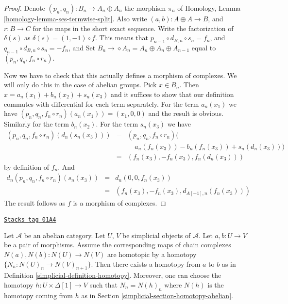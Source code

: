 \begin{proof}
Denote $(p_n, q_n) : B_n \to A_n \oplus A_n$ the morphism $\pi_n$
of Homology, Lemma \ref{homology-lemma-ses-termwise-split}.
Also write $(a, b) : A \oplus A \to B$, and
$r : B \to C$ for the maps in the short exact sequence.
Write the factorization of $\delta(s)$ as
$\delta(s) = (1, -1) \circ f$. This means that
$p_{n - 1} \circ d_{B, n} \circ s_n = f_n$, and
$q_{n - 1} \circ d_{B, n} \circ s_n = - f_n$, and
Set $B_n \to \diamond A_n = A_n \oplus A_n \oplus A_{n - 1}$
equal to $(p_n, q_n, f_n \circ r_n)$.

\medskip\noindent
Now we have to check that this actually defines a morphism
of complexes. We will only do this in the case of abelian groups.
Pick $x \in B_n$. Then $x = a_n(x_1) + b_n(x_2) + s_n(x_3)$
and it suffices to show that our definition commutes
with differential for each term separately. For the term
$a_n(x_1)$ we have $(p_n, q_n, f_n \circ r_n)(a_n(x_1)) =
(x_1, 0, 0)$ and the result is obvious. Similarly for
the term $b_n(x_2)$. For the term $s_n(x_3)$ we have
\begin{eqnarray*}
(p_n, q_n, f_n \circ r_n)(d_n(s_n(x_3))) & = &
(p_n, q_n, f_n \circ r_n)( \\
& & \ \ \ \ \ a_n(f_n(x_3)) - b_n(f_n(x_3)) + s_n(d_n(x_3))) \\
& = &
(f_n(x_3), -f_n(x_3), f_n(d_n(x_3)))
\end{eqnarray*}
by definition of $f_n$. And
\begin{eqnarray*}
d_n(p_n, q_n, f_n \circ r_n)(s_n(x_3)) & = & d_n(0, 0, f_n(x_3)) \\
& = &
(f_n(x_3), - f_n(x_3), d_{A[-1], n}(f_n(x_3)))
\end{eqnarray*}
The result follows as $f$ is a morphism of complexes.
\end{proof}

\begin{lemma}
\label{simplicial-lemma-backwards-homotopy}
\href{https://stacks.math.columbia.edu/tag/01A4}{\texttt{Stacks tag 01A4}}

Let $\mathcal{A}$ be an abelian category.
Let $U$, $V$ be simplicial objects of $\mathcal{A}$.
Let $a, b : U \to V$ be a pair of morphisms.
Assume the corresponding maps of chain complexes
$N(a), N(b) : N(U) \to N(V)$ are homotopic by
a homotopy $\{N_n : N(U)_n \to N(V)_{n + 1}\}$.
Then there exists a homotopy from $a$ to $b$ as in
Definition \ref{simplicial-definition-homotopy}. Moreover, one can choose the
homotopy $h : U \times \Delta[1] \to V$ such that
$N_n = N(h)_n$ where $N(h)$ is the homotopy coming
from $h$ as in Section \ref{simplicial-section-homotopy-abelian}.
\end{lemma}

